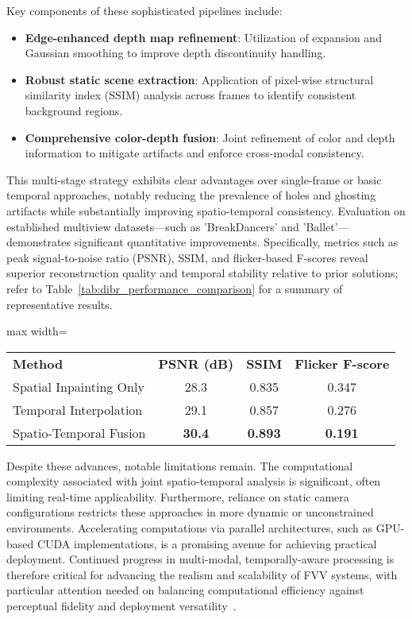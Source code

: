\documentclass[sigconf]{acmart}
\begin{document}
Key components of these sophisticated pipelines include:
\begin{itemize}
    \item \textbf{Edge-enhanced depth map refinement}: Utilization of expansion and Gaussian smoothing to improve depth discontinuity handling.
    \item \textbf{Robust static scene extraction}: Application of pixel-wise structural similarity index (SSIM) analysis across frames to identify consistent background regions.
    \item \textbf{Comprehensive color-depth fusion}: Joint refinement of color and depth information to mitigate artifacts and enforce cross-modal consistency.
\end{itemize}

This multi-stage strategy exhibits clear advantages over single-frame or basic temporal approaches, notably reducing the prevalence of holes and ghosting artifacts while substantially improving spatio-temporal consistency. Evaluation on established multiview datasets—such as 'BreakDancers' and 'Ballet'—demonstrates significant quantitative improvements. Specifically, metrics such as peak signal-to-noise ratio (PSNR), SSIM, and flicker-based F-scores reveal superior reconstruction quality and temporal stability relative to prior solutions; refer to Table~\ref{tab:dibr_performance_comparison} for a summary of representative results.

\begin{table*}[htbp]
\centering
\caption{Performance comparison of DIBR approaches on multiview datasets.}
\label{tab:dibr_performance_comparison}
\begin{adjustbox}{max width=\textwidth}
\begin{tabular}{lccc}
\toprule
\textbf{Method} & \textbf{PSNR (dB)} & \textbf{SSIM} & \textbf{Flicker F-score} \\
Spatial Inpainting Only   & 28.3 & 0.835 & 0.347 \\
Temporal Interpolation    & 29.1 & 0.857 & 0.276 \\
Spatio-Temporal Fusion    & \textbf{30.4} & \textbf{0.893} & \textbf{0.191} \\
\bottomrule
\end{tabular}
\end{adjustbox}
\end{table*}

Despite these advances, notable limitations remain. The computational complexity associated with joint spatio-temporal analysis is significant, often limiting real-time applicability. Furthermore, reliance on static camera configurations restricts these approaches in more dynamic or unconstrained environments. Accelerating computations via parallel architectures, such as GPU-based CUDA implementations, is a promising avenue for achieving practical deployment. Continued progress in multi-modal, temporally-aware processing is therefore critical for advancing the realism and scalability of FVV systems, with particular attention needed on balancing computational efficiency against perceptual fidelity and deployment versatility~\cite{refFVVRef98}.
\end{document}
